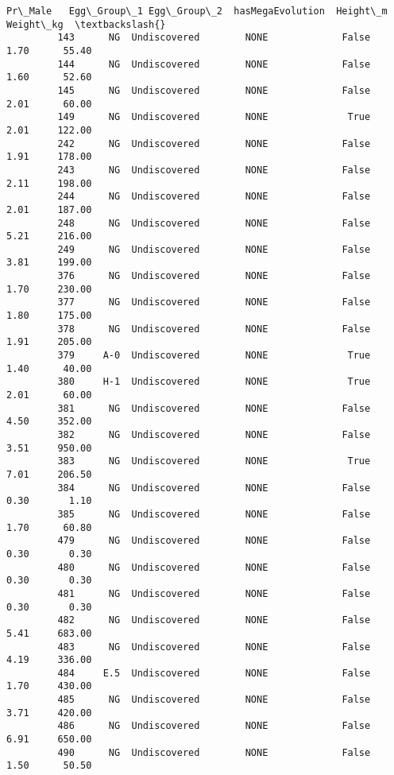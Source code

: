 \documentclass[11pt]{article}
\begin{document}
\begin{Verbatim}[commandchars=\\\{\}]
             Pr\_Male   Egg\_Group\_1 Egg\_Group\_2  hasMegaEvolution  Height\_m  Weight\_kg  \textbackslash{}
         143      NG  Undiscovered        NONE             False      1.70      55.40   
         144      NG  Undiscovered        NONE             False      1.60      52.60   
         145      NG  Undiscovered        NONE             False      2.01      60.00   
         149      NG  Undiscovered        NONE              True      2.01     122.00   
         242      NG  Undiscovered        NONE             False      1.91     178.00   
         243      NG  Undiscovered        NONE             False      2.11     198.00   
         244      NG  Undiscovered        NONE             False      2.01     187.00   
         248      NG  Undiscovered        NONE             False      5.21     216.00   
         249      NG  Undiscovered        NONE             False      3.81     199.00   
         376      NG  Undiscovered        NONE             False      1.70     230.00   
         377      NG  Undiscovered        NONE             False      1.80     175.00   
         378      NG  Undiscovered        NONE             False      1.91     205.00   
         379     A-0  Undiscovered        NONE              True      1.40      40.00   
         380     H-1  Undiscovered        NONE              True      2.01      60.00   
         381      NG  Undiscovered        NONE             False      4.50     352.00   
         382      NG  Undiscovered        NONE             False      3.51     950.00   
         383      NG  Undiscovered        NONE              True      7.01     206.50   
         384      NG  Undiscovered        NONE             False      0.30       1.10   
         385      NG  Undiscovered        NONE             False      1.70      60.80   
         479      NG  Undiscovered        NONE             False      0.30       0.30   
         480      NG  Undiscovered        NONE             False      0.30       0.30   
         481      NG  Undiscovered        NONE             False      0.30       0.30   
         482      NG  Undiscovered        NONE             False      5.41     683.00   
         483      NG  Undiscovered        NONE             False      4.19     336.00   
         484     E.5  Undiscovered        NONE             False      1.70     430.00   
         485      NG  Undiscovered        NONE             False      3.71     420.00   
         486      NG  Undiscovered        NONE             False      6.91     650.00   
         490      NG  Undiscovered        NONE             False      1.50      50.50   

\end{Verbatim}
\end{document}
